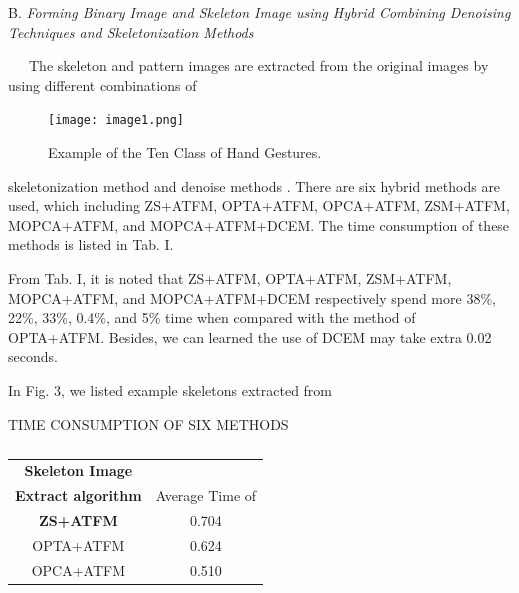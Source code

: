 \documentclass[10pt, a4paper]{article}
\begin{document}
\begin{multicols}{2}
B. \textit{Forming Binary Image and Skeleton Image using Hybrid Combining Denoising Techniques and Skeletonization Methods}
\par
 \ \ \ The skeleton and pattern images are extracted from
the original images by using different combinations of



\begin{figure}[H]
    \centering
    \texttt{[image: image1.png]}
    \caption{ \small {Example of the Ten Class of Hand Gestures.}}
    \label{fig:enter-label}
\end{figure}

skeletonization method and denoise methods . There are
six hybrid methods are used, which including ZS+ATFM,
OPTA+ATFM, OPCA+ATFM, ZSM+ATFM,
MOPCA+ATFM, and MOPCA+ATFM+DCEM. The
time consumption of these methods is listed in Tab. I.
\par
From Tab. I, it is noted that ZS+ATFM,
OPTA+ATFM, ZSM+ATFM, MOPCA+ATFM, and
MOPCA+ATFM+DCEM respectively spend more 38\%,
22\%, 33\%, 0.4\%, and 5\% time when compared with the
method of OPTA+ATFM. Besides, we can learned the
use of DCEM may take extra 0.02 seconds.
\par
In Fig. 3, we listed example skeletons extracted from
\newpage
\begin{table}[H]
\caption{\label{tab:canonsummary}}TIME CONSUMPTION OF SIX METHODS
\begin{center}
\begin{tabular}{|c|c|}
\hline
\textbf{Skeleton Image} \\
\textbf{Extract algorithm}
& 
Average Time of 


\\




\hline
\textbf{ZS+ATFM} & 0.704 \\
OPTA+ATFM & 0.624 \\
OPCA+ATFM & 0.510\\


\end{tabular}
\end{center}
\end{table}
\end{multicols}
\end{document}
